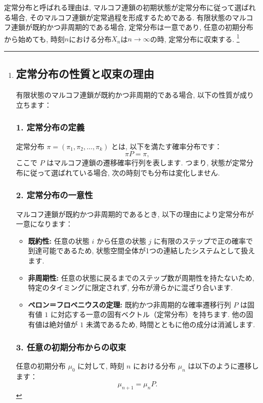 \documentclass[a4j]{jsarticle}
\begin{document}
定常分布と呼ばれる理由は, マルコフ連鎖の初期状態が定常分布に従って選ばれる場合, そのマルコフ連鎖が定常過程を形成するためである. 有限状態のマルコフ連鎖が既約かつ非周期的である場合, 定常分布は一意であり, 任意の初期分布から始めても, 時刻$n$における分布$X_n$は$n \rightarrow \infty$の時, 定常分布に収束する.
\footnote{
	\subsection*{定常分布の性質と収束の理由}

	有限状態のマルコフ連鎖が既約かつ非周期的である場合, 以下の性質が成り立ちます：

	\subsubsection*{1. 定常分布の定義}
	定常分布 $\pi = (\pi_1, \pi_2, \ldots, \pi_k)$ とは, 以下を満たす確率分布です：
	\[
		\pi P = \pi,
	\]
	ここで $P$ はマルコフ連鎖の遷移確率行列を表します. つまり, 状態が定常分布に従って選ばれている場合, 次の時刻でも分布は変化しません.

	\subsubsection*{2. 定常分布の一意性}
	マルコフ連鎖が既約かつ非周期的であるとき, 以下の理由により定常分布が一意になります：

	\begin{itemize}
		\item \textbf{既約性:} 任意の状態 $i$ から任意の状態 $j$ に有限のステップで正の確率で到達可能であるため, 状態空間全体が1つの連結したシステムとして扱えます.
		\item \textbf{非周期性:} 任意の状態に戻るまでのステップ数が周期性を持たないため, 特定のタイミングに限定されず, 分布が滑らかに混ざり合います.
		\item \textbf{ペロン＝フロベニウスの定理:} 既約かつ非周期的な確率遷移行列 $P$ は固有値 $1$ に対応する一意の固有ベクトル（定常分布）を持ちます. 他の固有値は絶対値が $1$ 未満であるため, 時間とともに他の成分は消滅します.
	\end{itemize}

	\subsubsection*{3. 任意の初期分布からの収束}
	任意の初期分布 $\mu_0$ に対して, 時刻 $n$ における分布 $\mu_n$ は以下のように遷移します：
	\[
		\mu_{n+1} = \mu_n P.
	\]

}
\end{document}
